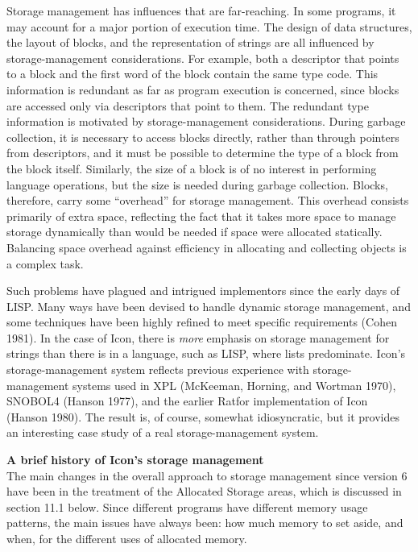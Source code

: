 Storage management has influences that are far-reaching. In some
programs, it may account for a major portion of execution time. The
design of data structures, the layout of blocks, and the
representation of strings are all influenced by storage-management
considerations. For example, both a descriptor that points to a block
and the first word of the block contain the same type code. This
information is redundant as far as program execution is concerned,
since blocks are accessed only via descriptors that point to them. The
redundant type information is motivated by storage-management
considerations. During garbage collection, it is necessary to access
blocks directly, rather than through pointers from descriptors, and it
must be possible to determine the type of a block from the block
itself.  Similarly, the size of a block is of no interest in
performing language operations, but the size is needed during garbage
collection. Blocks, therefore, carry some ``overhead'' for storage
management. This overhead consists primarily of extra space,
reflecting the fact that it takes more space to manage storage
dynamically than would be needed if space were allocated
statically. Balancing space overhead against efficiency in allocating
and collecting objects is a complex task.

Such problems have plagued and intrigued implementors since the early
days of LISP. Many ways have been devised to handle dynamic storage
management, and some techniques have been highly refined to meet
specific requirements (Cohen 1981). In the case of Icon, there is
\textit{more }emphasis on storage management for strings than there is
in a language, such as LISP, where lists predominate. Icon's
storage-management system reflects previous experience with
storage-management systems used in XPL (McKeeman, Horning, and Wortman
1970), SNOBOL4 (Hanson 1977), and the earlier Ratfor implementation of
Icon (Hanson 1980). The result is, of course, somewhat idiosyncratic,
but it provides an interesting case study of a real storage-management
system.

\noindent\textbf{A brief history of Icon's storage management}\\
The main changes in the overall approach to storage management since
version 6 have been in the treatment of the Allocated Storage areas,
which is discussed in section 11.1 below. Since different programs
have different memory usage patterns, the main issues have always
been: how much memory to set aside, and when, for the different uses
of allocated memory.

